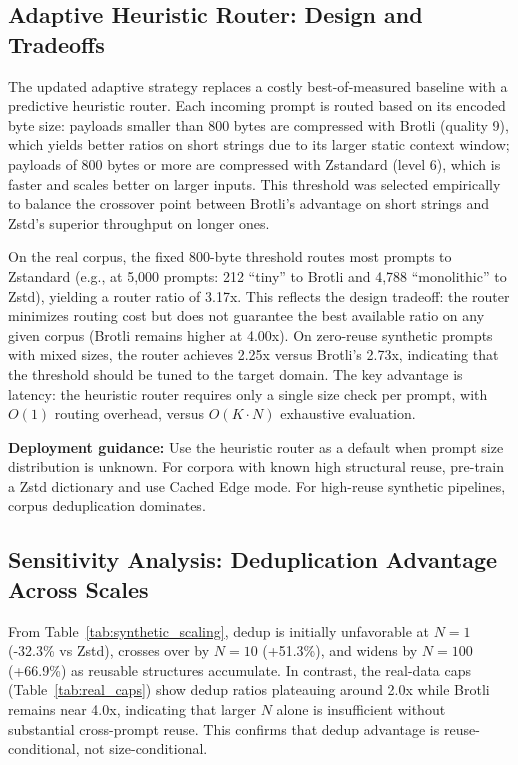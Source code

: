 \documentclass[10pt,conference]{IEEEtran}
\begin{document}
\subsection{Adaptive Heuristic Router: Design and Tradeoffs}
The updated adaptive strategy replaces a costly best-of-measured baseline with a predictive heuristic router. Each incoming prompt is routed based on its encoded byte size: payloads smaller than 800 bytes are compressed with Brotli (quality 9), which yields better ratios on short strings due to its larger static context window; payloads of 800 bytes or more are compressed with Zstandard (level 6), which is faster and scales better on larger inputs. This threshold was selected empirically to balance the crossover point between Brotli's advantage on short strings and Zstd's superior throughput on longer ones.

On the real corpus, the fixed 800-byte threshold routes most prompts to Zstandard (e.g., at 5,000 prompts: 212 ``tiny'' to Brotli and 4,788 ``monolithic'' to Zstd), yielding a router ratio of 3.17x. This reflects the design tradeoff: the router minimizes routing cost but does not guarantee the best available ratio on any given corpus (Brotli remains higher at 4.00x). On zero-reuse synthetic prompts with mixed sizes, the router achieves 2.25x versus Brotli's 2.73x, indicating that the threshold should be tuned to the target domain. The key advantage is latency: the heuristic router requires only a single size check per prompt, with $O(1)$ routing overhead, versus \(O(K \cdot N)\) exhaustive evaluation.

\textbf{Deployment guidance:} Use the heuristic router as a default when prompt size distribution is unknown. For corpora with known high structural reuse, pre-train a Zstd dictionary and use Cached Edge mode. For high-reuse synthetic pipelines, corpus deduplication dominates.

\subsection{Sensitivity Analysis: Deduplication Advantage Across Scales}
From Table~\ref{tab:synthetic_scaling}, dedup is initially unfavorable at $N=1$ (-32.3\% vs Zstd), crosses over by $N=10$ (+51.3\%), and widens by $N=100$ (+66.9\%) as reusable structures accumulate. In contrast, the real-data caps (Table~\ref{tab:real_caps}) show dedup ratios plateauing around 2.0x while Brotli remains near 4.0x, indicating that larger $N$ alone is insufficient without substantial cross-prompt reuse. This confirms that dedup advantage is reuse-conditional, not size-conditional.
\end{document}
